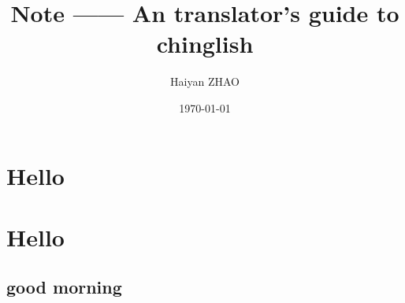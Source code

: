 \documentclass{mynote}
\title{Note ------ An translator's guide to chinglish}
\author{Haiyan ZHAO}
\date{\today}
\begin{document}
\makemytitle

\chapter{Hello}
\chapter{Hello}
\section{good morning}
\end{document}
